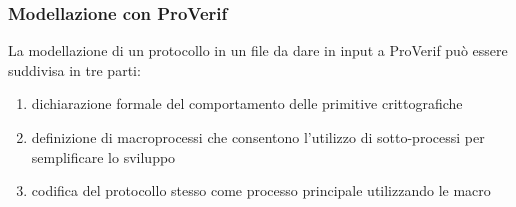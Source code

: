 \subsubsection*{Modellazione con ProVerif}

La modellazione di un protocollo in un file da dare in input a ProVerif può essere suddivisa in tre parti:
\begin{enumerate}
    \item dichiarazione formale del comportamento delle primitive crittografiche
    \item definizione di macroprocessi che consentono l'utilizzo di sotto-processi per semplificare lo sviluppo
    \item codifica del protocollo stesso come processo principale utilizzando le macro
\end{enumerate}

